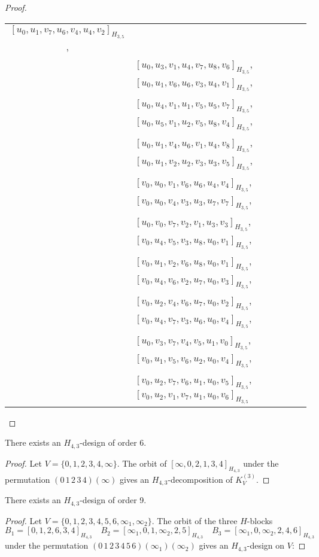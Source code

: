 \begin{subappendices}
\begin{proof}
{\begin{longtable}{|c|l|}
  $[u_0, u_1, v_7, u_6, v_4, u_4, v_2]_{H_{3,5}}$, \\* &
  $[u_0, u_3, v_1, u_4, v_7, u_8, v_6]_{H_{3,5}}$,
  $[u_0, u_1, v_6, u_6, v_3, u_4, v_1]_{H_{3,5}}$, \\* &
  $[u_0, u_4, v_1, u_1, v_5, u_5, v_7]_{H_{3,5}}$,
  $[u_0, u_5, v_1, u_2, v_5, u_8, v_4]_{H_{3,5}}$, \\* &
  $[u_0, u_1, v_4, u_6, v_1, u_4, v_8]_{H_{3,5}}$,
  $[u_0, u_1, v_2, u_2, v_3, u_3, v_5]_{H_{3,5}}$, \\* &
  $[v_0, u_0, v_1, v_6, u_6, u_4, v_4]_{H_{3,5}}$,
  $[v_0, u_0, v_4, v_3, u_3, u_7, v_7]_{H_{3,5}}$, \\* &
  $[u_0, v_0, v_7, v_2, v_1, u_3, v_3]_{H_{3,5}}$,
  $[v_0, u_4, v_5, v_3, u_8, u_0, v_1]_{H_{3,5}}$, \\* &
  $[v_0, u_1, v_2, v_6, u_8, u_0, v_1]_{H_{3,5}}$,
  $[v_0, u_4, v_6, v_2, u_7, u_0, v_3]_{H_{3,5}}$, \\* &
  $[v_0, u_2, v_4, v_6, u_7, u_0, v_2]_{H_{3,5}}$,
  $[v_0, u_4, v_7, v_3, u_6, u_0, v_4]_{H_{3,5}}$, \\* &
  $[u_0, v_3, v_7, v_4, v_5, u_1, v_0]_{H_{3,5}}$,
  $[v_0, u_1, v_5, v_6, u_2, u_0, v_4]_{H_{3,5}}$, \\* &
  $[v_0, u_2, v_7, v_6, u_1, u_0, v_5]_{H_{3,5}}$,
  $[v_0, u_2, v_1, v_7, u_1, u_0, v_6]_{H_{3,5}}$
\\ \hline
\end{longtable}
}
\end{proof}


\begin{example} \label{eg:H_43-6}
There exists an $H_{4,3}$-design of order 6.
\end{example}

\begin{proof}
Let $V = \{0,1,2,3,4,\infty\}$. The orbit of $[\infty, 0, 2, 1, 3, 4]_{H_{4,3}}$ under the permutation $(0\, 1\, 2\, 3\, 4)(\infty)$ gives an $H_{4,3}$-decomposition of $K_V^{(3)}$.
\end{proof}


\begin{example} \label{eg:H_43-9}
There exists an $H_{4,3}$-design of order 9.
\end{example}

\begin{proof}
Let $V = \{0,1,2,3,4,5,6,\infty_1,\infty_2\}$. The orbit of the three $H$-blocks
\[
    B_1 = [0,1,2,6,3,4]_{H_{4,3}} \quad
    B_2 = [\infty_1, 0, 1, \infty_2, 2, 5]_{H_{4,3}} \quad
    B_3 = [\infty_1, 0, \infty_2, 2, 4, 6]_{H_{4,3}}
\]
under the permutation $(0\, 1\, 2\, 3\, 4\, 5\, 6)(\infty_1)(\infty_2)$ gives an $H_{4,3}$-design on $V$:


\end{proof}
\end{subappendices}

